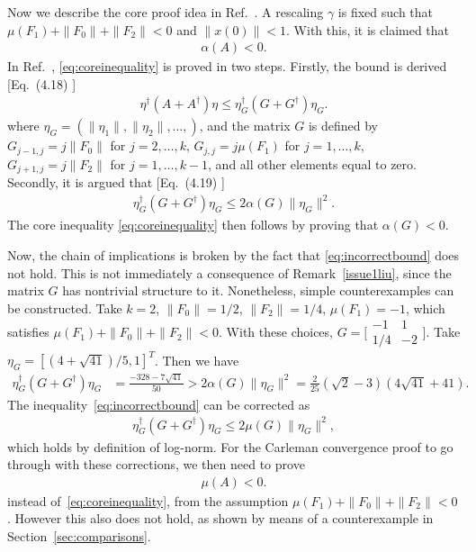 \documentclass[superscriptaddress,onecolumn,nofootinbib,longbibliography,a4paper,accepted=2026-09-29]{quantumarticle}
\theoremstyle{plain}
\theoremstyle{definition}
\numberwithin{thm}{section}
\numberwithin{assumption}{section}
\numberwithin{lemma}{section}
\numberwithin{prop}{section}
\numberwithin{cor}{section}
\numberwithin{definition}{section}
\numberwithin{rmk}{section}
\numberwithin{equation}{section}
\begin{document}
Now we describe the core proof idea in Ref.~\cite{liu2021efficient}. A rescaling $\gamma$ is fixed such that $\mu(F_1) + \| F_0\| + \| F_2\| < 0$ and  $\|x(0)\|<1$. With this, it is claimed that
\begin{align}
\label{eq:coreinequality}
    \alpha(A) <0.
\end{align}
In Ref.~\cite{liu2021efficient}, \eqref{eq:coreinequality} is proved in two steps. Firstly, the bound is derived [Eq.~(4.18) \cite{liu2021efficient}]
\begin{align}
   \eta^\dag (A + A^\dag)\eta \leq  \eta_G^\dag (G + G^\dag) \eta_G.
\end{align}
where $\eta_G = ( \|\eta_1\|,  \|\eta_2\|, \dots, )$, and the matrix $G$ is defined by $G_{j-1,j} = j\| F_0\|$ for $j=2,\dots, k$, $G_{j,j} = j \mu(F_1)$ for $j=1,\dots, k$, $G_{j+1,j} = j\|F_2\|$ for $j=1,\dots, k-1$, and all other elements equal to zero. 
Secondly, it is argued that [Eq.~(4.19) \cite{liu2021efficient}]
\begin{align}
\label{eq:incorrectbound}
   \eta_G^\dag (G + G^\dag) \eta_G \leq 2 \alpha(G) \| \eta_G\|^2. 
\end{align}
The core inequality \eqref{eq:coreinequality}  then follows by proving that $\alpha(G)<0$.  


Now, the chain of implications is broken by the fact that \eqref{eq:incorrectbound} does not hold. This is not immediately a consequence of Remark~\ref{issue1liu}, since the matrix $G$ has nontrivial structure to it. Nonetheless, simple counterexamples can be constructed. Take $k=2$, $\| F_0\| = 1/2$, $\|F_2\| = 1/4$, $\mu(F_1) =-1$, which satisfies $\mu(F_1) + \| F_0\| + \| F_2\| <0$. With these choices, $G = \big[\begin{smallmatrix}
  -1 & 1\\
  1/4 & -2
\end{smallmatrix}\big]$. Take \mbox{$\eta_G = [(4+\sqrt{41})/5,1]^T $}. Then we have
\begin{align}
\nonumber
\eta_G^\dag (G+G^\dag) \eta_G & = \frac{-328-7\sqrt{41}}{50}  > 2 \alpha(G) \| \eta_G\|^2  = \frac{2}{25} \left(\sqrt{2}-3\right) \left(4 \sqrt{41}+41\right).
\nonumber
\end{align}
The inequality~\eqref{eq:incorrectbound} can be corrected as
\begin{align}
   \eta_G^\dag (G + G^\dag) \eta_G \leq 2 \mu(G) \| \eta_G\|^2,
\end{align}
which holds by definition of log-norm. For the Carleman convergence proof to go through with these corrections, we then need to prove
\begin{align}
    \mu(A)<0.
\end{align}
instead of~\eqref{eq:coreinequality}, from the assumption $\mu(F_1) + \| F_0\| + \| F_2\| <0$. However this also does not hold, as shown by means of a counterexample in Section~\ref{sec:comparisons}.
\end{document}

